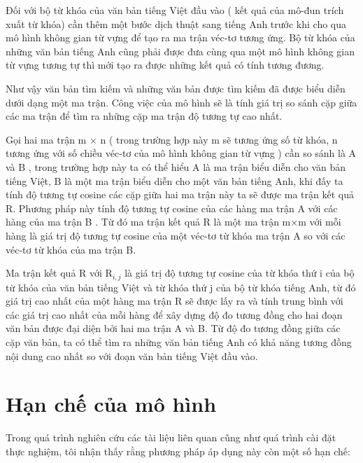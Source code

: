 \documentclass[12pt]{report}
\begin{document}
Đối với bộ từ khóa của văn bản tiếng Việt đầu vào ( kết quả của mô-đun trích xuất từ khóa) cần thêm một bước dịch thuật sang tiếng Anh trước khi cho qua mô hình không gian từ vựng để tạo ra ma trận véc-tơ tương ứng. Bộ từ khóa của những văn bản tiếng Anh cũng phải được đưa cùng qua một mô hình không gian từ vựng tương tự thì mới tạo ra được những kết quả có tính tương đương.

Như vậy văn bản tìm kiếm và những văn bản được tìm kiếm đã được biểu diễn dưới dạng một ma trận. Công việc của mô hình sẽ là tính giá trị so sánh cặp giữa các ma trận để tìm ra những cặp ma trận độ tương tự cao nhất.

Gọi hai ma trận m $\times$ n ( trong trường hợp này m sẽ tương ứng số từ khóa, n tương ứng với số chiều véc-tơ của mô hình không gian từ vựng ) cần so sánh là A và B ,  trong trường hợp này ta có thể hiểu A là ma trận biểu diễn cho văn bản tiếng Việt, B là một ma trận biểu diễn cho một văn bản tiếng Anh, khi đấy ta tính độ tương tự cosine các cặp giữa hai ma trận này ta sẽ được ma trận kết quả R. Phương pháp này tính độ tương tự cosine của các hàng ma trận A với các hàng của ma trận B \cite{cia-pairwise}. Từ đó ma trận kết quả R là một ma trận m$\times$m với mỗi hàng là giá trị độ tương tự cosine của một véc-tơ từ khóa ma trận A so với các véc-tơ từ khóa của ma trận B. 

Ma trận kết quả R với R$_{i, j}$ là giá trị độ tương tự cosine của từ khóa thứ i của bộ từ khóa của văn bản tiếng Việt và từ khóa thứ j của bộ từ khóa tiếng Anh, từ đó giá trị cao nhất của một hàng ma trận R sẽ được lấy ra và tính trung bình với các giá trị cao nhất của mỗi hàng để xây dựng độ đo tương đồng cho hai đoạn văn bản được đại diện bởi hai ma trận A và B. Từ độ đo tương đồng giữa các cặp văn bản, ta có thể tìm ra những văn bản tiếng Anh có khả năng tương đồng nội dung cao nhất so với đoạn văn bản tiếng Việt đầu vào. 

\section{Hạn chế của mô hình}

Trong quá trình nghiên cứu các tài liệu liên quan cũng như quá trình cài đặt thực nghiệm, tôi nhận thấy rằng phương pháp áp dụng này còn một số hạn chế:
\end{document}
